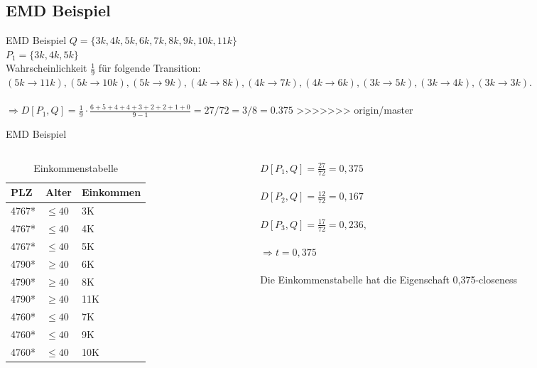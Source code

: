 \subsection{EMD Beispiel}
\begin{frame}{EMD Beispiel}
	$Q = \{3k, 4k, 5k, 6k, 7k, 8k, 9k, 10k, 11k\}$\\
	$P_1 = \{3k, 4k, 5k\}$ \\
	Wahrscheinlichkeit $\frac{1}{9}$ für folgende Transition:
	$(5k\rightarrow 11k), (5k\rightarrow 10k), (5k \rightarrow 9k),
	(4k \rightarrow 8k), (4k\rightarrow 7k), (4k \rightarrow 6k), (3k\rightarrow 5k), (3k\rightarrow 4k), (3k \rightarrow 3k).$\\
	\ \\
	$\Rightarrow D[P_1,Q]= \frac{1}{9} \cdot \frac{6 + 5 + 4 + 4 + 3 + 2 + 2 + 1 + 0}{9-1} = 27/72 = 3/8 = 0.375$
>>>>>>> origin/master
\end{frame}
\begin{frame} {EMD Beispiel}
	
	\begin{columns}[T]
		\begin{column}{0.5\textwidth}
			\begin{table}[]
				\centering
				\label{tclossenessExample}
				\begin{tabular}{|l|l|l|}
					\hline
					\textbf{PLZ}   & \textbf{Alter}    & \textbf{Einkommen} \\\hline
					4767* & $\le 40$ & 3K \\
					4767* & $\le 40$ & 4K \\
					4767* & $\le 40$ & 5K \\\hline
					4790* & $\ge 40$ & 6K \\
					4790* & $\ge 40$ & 8K \\
					4790* & $\ge 40$ & 11K \\\hline
					4760* & $\le 40$ & 7K \\
					4760* & $\le 40$ & 9K \\
					4760* & $\le 40$ & 10K \\\hline
				\end{tabular}
				\caption{Einkommenstabelle}
			\end{table}
		\end{column}
		
		\begin{column}{0.5\textwidth}
			$D[P_1,Q]=\frac{27}{72} = 0,375$\\
			\ \\
			$D[P_2,Q]=\frac{12}{72} = 0,167$\\
			\ \\
			$D[P_3,Q]=\frac{17}{72} = 0,236,$\\
			\ \\
			$\Rightarrow t=0,375$\\
			\ \\
			Die Einkommenstabelle hat die Eigenschaft 0,375-closeness	
		\end{column}
	\end{columns}
\end{frame}
